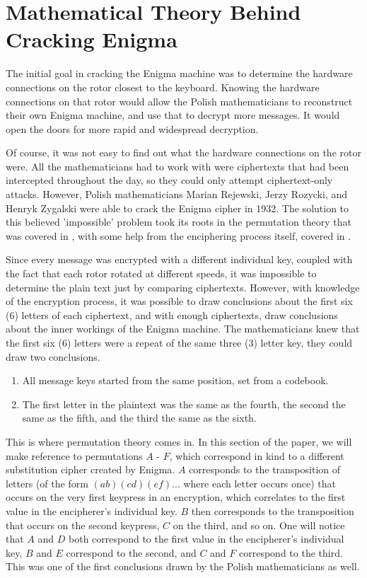 \section{Mathematical Theory Behind Cracking Enigma}\label{sec:maththeory}

The initial goal in cracking the Enigma machine was to determine the hardware connections on the rotor closest to the keyboard. Knowing the hardware connections on that rotor would allow the Polish mathematicians to reconstruct their own Enigma machine, and use that to decrypt more messages. It would open the doors for more rapid and widespread decryption.

Of course, it was not easy to find out what the hardware connections on the rotor were. All the mathematicians had to work with were ciphertexts that had been intercepted throughout the day, so they could only attempt ciphertext-only attacks. However, Polish mathematicians Marian Rejewski, Jerzy Rozycki, and Henryk Zygalski were able to crack the Enigma cipher in 1932. The solution to this believed 'impossible' problem took its roots in the permutation theory that was covered in , with some help from the enciphering process itself, covered in .

Since every message was encrypted with a different individual key, coupled with the fact that each rotor rotated at different speeds, it was impossible to determine the plain text just by comparing ciphertexts. However, with knowledge of the encryption process, it was possible to draw conclusions about the first six (6) letters of each ciphertext, and with enough ciphertexts, draw conclusions about the inner workings of the Enigma machine. The mathematicians knew that the first six (6) letters were a repeat of the same three (3) letter key, they could draw two conclusions.

\begin{enumerate}
\item All message keys started from the same position, set from a codebook.
\item The first letter in the plaintext was the same as the fourth, the second the same as the fifth, and the third the same as the sixth.
\end{enumerate}

This is where permutation theory comes in. In this section of the paper, we will make reference to permutations $A$ - $F$, which correspond in kind to a different substitution cipher created by Enigma. $A$ corresponds to the transposition of letters (of the form $(ab)(cd)(ef)...$ where each letter occurs once) that occurs on the very first keypress in an encryption, which correlates to the first value in the encipherer's individual key. $B$ then corresponds to the transposition that occurs on the second keypress, $C$ on the third, and so on. One will notice that $A$ and $D$ both correspond to the first value in the encipherer's individual key, $B$ and $E$ correspond to the second, and $C$ and $F$ correspond to the third. This was one of the first conclusions drawn by the Polish mathematicians as well.


